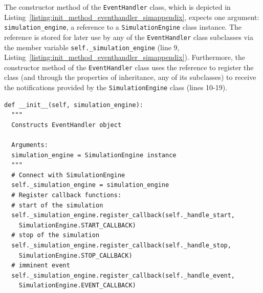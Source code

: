 The constructor method of the \lstinline{EventHandler} class, which is depicted in Listing~\ref{listing:init_method_eventhandler_simappendix}, expects one argument: \lstinline{simulation_engine}, a reference to a \lstinline{SimulationEngine} class instance. The reference is stored for later use by any of the \lstinline{EventHandler} class subclasses via the member variable \lstinline{self._simulation_engine} (line 9, Listing~\ref{listing:init_method_eventhandler_simappendix}). Furthermore, the constructor method of the \lstinline{EventHandler} class uses the reference to register the class (and through the properties of inheritance, any of its subclasses) to receive the notifications provided by the \lstinline{SimulationEngine} class (lines 10-19).
\begin{lstlisting}[caption=\lstinline{__init__(simulation_engine)} member method of the \lstinline{EventHandler} class, label=listing:init_method_eventhandler_simappendix]
def __init__(self, simulation_engine):
  """
  Constructs EventHandler object

  Arguments:
  simulation_engine = SimulationEngine instance
  """
  # Connect with SimulationEngine
  self._simulation_engine = simulation_engine
  # Register callback functions:
  # start of the simulation
  self._simulation_engine.register_callback(self._handle_start,
    SimulationEngine.START_CALLBACK)
  # stop of the simulation
  self._simulation_engine.register_callback(self._handle_stop,
    SimulationEngine.STOP_CALLBACK)
  # imminent event
  self._simulation_engine.register_callback(self._handle_event,
    SimulationEngine.EVENT_CALLBACK)
\end{lstlisting}

